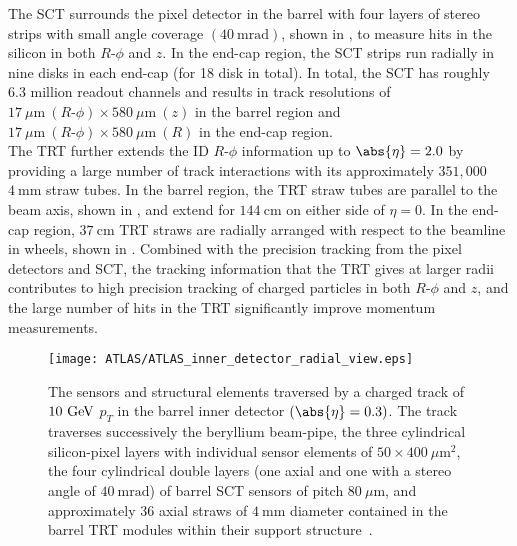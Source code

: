 The \Gls{SCT} surrounds the pixel detector in the barrel with four layers of stereo strips with small angle coverage $(40~\mathrm{mrad})$, shown in , to measure hits in the silicon in both $R\textrm{-}\phi$ and $z$.
In the end-cap region, the SCT strips run radially in nine disks in each end-cap (for 18 disk in total).
In total, the SCT has roughly 6.3 million readout channels and results in track resolutions of $17~\mu\mathrm{m}~(R\textrm{-}\phi) \times 580~\mu\mathrm{m}~(z)$ in the barrel region and $17~\mu\mathrm{m}~(R\textrm{-}\phi) \times 580~\mu\mathrm{m}~(R)$ in the end-cap region.\\

The \Gls{TRT} further extends the ID $R\textrm{-}\phi$ information up to $\abs{\eta} = 2.0$ by providing a large number of track interactions with its approximately $351,000$ $4~\textrm{mm}$ straw tubes.
In the barrel region, the TRT straw tubes are parallel to the beam axis, shown in , and extend for $144~\mathrm{cm}$ on either side of $\eta = 0$.
In the end-cap region, $37~\mathrm{cm}$ TRT straws are radially arranged with respect to the beamline in wheels, shown in .
Combined with the precision tracking from the pixel detectors and SCT, the tracking information that the TRT gives at larger radii contributes to high precision tracking of charged particles in both $R\textrm{-}\phi$ and $z$, and the large number of hits in the TRT significantly improve momentum measurements.

\begin{figure}[htbp]
 \centering
 \texttt{[image: ATLAS/ATLAS\_inner\_detector\_radial\_view.eps]}
 \caption[Scale cut-away view of the pixel detector, Semiconductor Tracker, and Transition Radiation Tracker in the barrel-region.]{%
  The sensors and structural elements traversed by a charged track of $10~\mathrm{GeV}$ $p_{T}$ in the barrel inner detector $(\abs{\eta} = 0.3)$.
  The track traverses successively the beryllium beam-pipe, the three cylindrical silicon-pixel layers with individual sensor elements of $50 \times 400~\mu\mathrm{m}^{2}$, the four cylindrical double layers (one axial and one with a stereo angle of $40~\mathrm{mrad}$) of barrel SCT sensors of pitch $80~\mu\mathrm{m}$, and approximately 36 axial straws of $4~\mathrm{mm}$ diameter contained in the barrel TRT modules within their support structure~\cite{PERF-2007-01}.}\label{fig:ATLAS_inner_detector_radial_view}
\end{figure}

